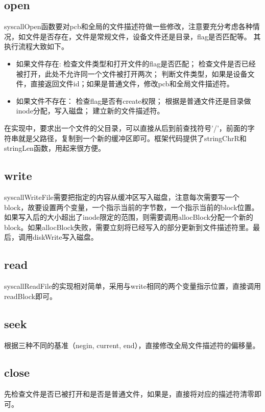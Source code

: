 \documentclass[12pt,a4paper,UTF8]{article}
\begin{document}
\subsection{open}
syscallOpen函数要对pcb和全局的文件描述符做一些修改，注意要充分考虑各种情况，如文件是否存在，文件是常规文件，设备文件还是目录，flag是否匹配等。
其执行流程大致如下。
\begin{itemize}
	\item 如果文件存在:
	\subitem 检查文件类型和打开文件的flag是否匹配；
	\subitem 检查文件是否已经被打开，此处不允许同一个文件被打开两次；
	\subitem 判断文件类型，如果是设备文件，直接返回文件id；如果是普通文件，修改pcb和全局文件描述符。
	
	\item 如果文件不存在：
	\subitem 检查flag是否有create权限；
	\subitem 根据是普通文件还是目录做inode分配，写入磁盘；
	\subitem 建立新的文件描述符。
	
\end{itemize}
在实现中，要求出一个文件的父目录，可以直接从后到前查找符号'/'，前面的字符串就是父路径，复制到一个新的缓冲区即可。框架代码提供了stringChrR和stringLen函数，用起来很方便。

\subsection{write}
syscallWriteFile需要把指定的内容从缓冲区写入磁盘，注意每次需要写一个block，故要设置两个变量，一个指示当前的字节数，一个指示当前的block位置。如果写入后的大小超出了inode限定的范围，则需要调用allocBlock分配一个新的block。如果allocBlock失败，需要立刻将已经写入的部分更新到文件描述符里。最后，调用diskWrite写入磁盘。


\subsection{read}
syscallReadFile的实现相对简单，采用与write相同的两个变量指示位置，直接调用readBlock即可。


\subsection{seek}
根据三种不同的基准（negin, current, end），直接修改全局文件描述符的偏移量。


\subsection{close}
先检查文件是否已被打开和是否是普通文件，如果是，直接将对应的描述符清零即可。

\end{document}
